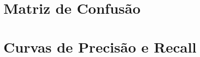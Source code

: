 \documentclass[
    12pt,
    openright,
    oneside,
    a4paper,
    sumario=tradicional,
    english,
    brazil,
    ]{abntex2}
\begin{document}
%

\section{Matriz de Confusão}

%

\section{Curvas de Precisão e Recall}
\end{document}
